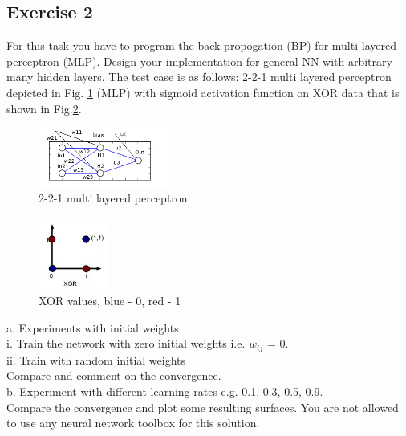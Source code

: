\documentclass[a4paper, 12pt]{article}
\begin{document}
\subsection{Exercise 2}

For this task you have to program the back-propogation (BP) for multi layered perceptron (MLP). Design your implementation for general NN with arbitrary many hidden layers. The test case is as follows:  2-2-1 multi layered perceptron depicted in Fig. \ref{fig:perceptron} (MLP) with sigmoid activation function on XOR data that is shown in Fig.\ref{fig:perceptronLinearAnalysis}. \\

\begin{figure}[h]
  \centering
  \caption{2-2-1 multi layered perceptron \label{fig:perceptron}}
  \includegraphics[width=0.4\textwidth]{perceptron}
\end{figure}

\begin{figure}[h]
  \centering
  \caption{XOR values, blue - 0, red - 1 \label{fig:perceptronLinearAnalysis}}
  \includegraphics[width=0.2\textwidth]{perceptronLinearAnalysis}
\end{figure}

a. Experiments with initial weights\\

i. Train the network with zero initial weights i.e. $w_{ij}$ = 0.\\

ii. Train with random initial weights\\

Compare and comment on the convergence.\\

b. Experiment with different learning rates e.g. 0.1, 0.3, 0.5, 0.9.\\

Compare the convergence and plot some resulting surfaces. You are not allowed to use any neural network toolbox for this solution.\\
\end{document}
